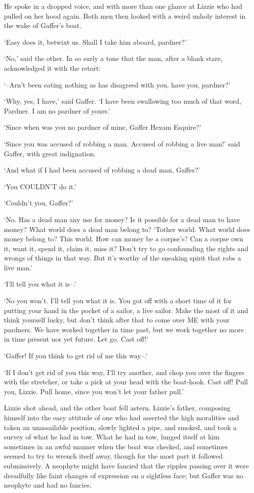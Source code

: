 He spoke in a dropped voice, and with more than one glance at Lizzie who
had pulled on her hood again. Both men then looked with a weird unholy
interest in the wake of Gaffer’s boat.

‘Easy does it, betwixt us. Shall I take him aboard, pardner?’

‘No,’ said the other. In so surly a tone that the man, after a blank
stare, acknowledged it with the retort:

‘--Arn’t been eating nothing as has disagreed with you, have you,
pardner?’

‘Why, yes, I have,’ said Gaffer. ‘I have been swallowing too much of
that word, Pardner. I am no pardner of yours.’

‘Since when was you no pardner of mine, Gaffer Hexam Esquire?’

‘Since you was accused of robbing a man. Accused of robbing a live man!’
said Gaffer, with great indignation.

‘And what if I had been accused of robbing a dead man, Gaffer?’

‘You COULDN’T do it.’

‘Couldn’t you, Gaffer?’

‘No. Has a dead man any use for money? Is it possible for a dead man to
have money? What world does a dead man belong to? ‘Tother world. What
world does money belong to? This world. How can money be a corpse’s? Can
a corpse own it, want it, spend it, claim it, miss it? Don’t try to go
confounding the rights and wrongs of things in that way. But it’s worthy
of the sneaking spirit that robs a live man.’

‘I’ll tell you what it is--.’

‘No you won’t. I’ll tell you what it is. You got off with a short time
of it for putting your hand in the pocket of a sailor, a live sailor.
Make the most of it and think yourself lucky, but don’t think after
that to come over ME with your pardners. We have worked together in time
past, but we work together no more in time present nor yet future. Let
go. Cast off!’

‘Gaffer! If you think to get rid of me this way--.’

‘If I don’t get rid of you this way, I’ll try another, and chop you over
the fingers with the stretcher, or take a pick at your head with the
boat-hook. Cast off! Pull you, Lizzie. Pull home, since you won’t let
your father pull.’

Lizzie shot ahead, and the other boat fell astern. Lizzie’s father,
composing himself into the easy attitude of one who had asserted the
high moralities and taken an unassailable position, slowly lighted a
pipe, and smoked, and took a survey of what he had in tow. What he had
in tow, lunged itself at him sometimes in an awful manner when the boat
was checked, and sometimes seemed to try to wrench itself away, though
for the most part it followed submissively. A neophyte might have
fancied that the ripples passing over it were dreadfully like faint
changes of expression on a sightless face; but Gaffer was no neophyte
and had no fancies.

